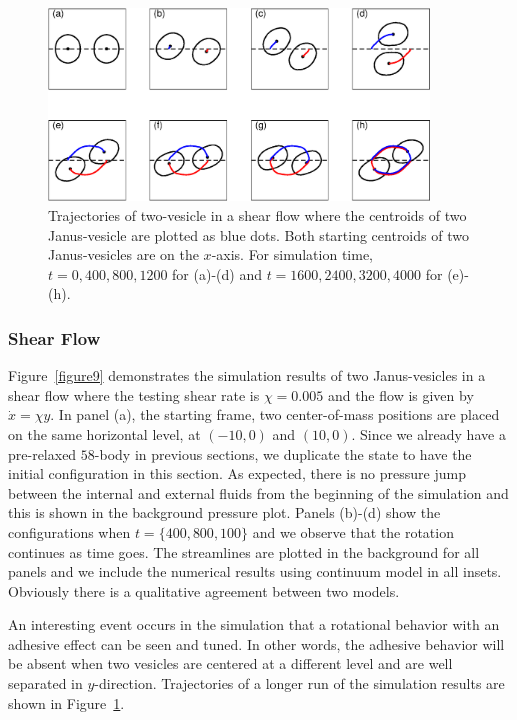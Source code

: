 \documentclass[lineno]{jfm}
\begin{document}
\begin{figure}
\begin{center}
\includegraphics[width=0.9\textwidth]{ShearTraj.eps}
\end{center} 
  \caption{Trajectories of two-vesicle in a shear flow where the centroids of two Janus-vesicle are plotted as blue dots. Both starting centroids of two Janus-vesicles are on the $x$-axis. For simulation time, $t = {0, 400,800,1200}$ for (a)-(d) and $t = {1600, 2400, 3200, 4000}$ for (e)-(h).  }
    \label{figure10}
\end{figure}




\subsubsection{Shear Flow}

Figure~\ref{figure9} demonstrates the simulation results of two Janus-vesicles in a shear flow where the testing shear rate is $\chi=0.005$ and the flow is given by $\dot x = \chi y$. In panel (a), the starting frame, two center-of-mass positions are placed 
on the same horizontal level, at $(-10,0)$ and $(10,0)$. Since we already have a pre-relaxed $58$-body in previous sections, we duplicate the state to have the initial configuration in this section. As expected, there 
is no pressure jump between the internal and external fluids from the beginning of the simulation and this is shown in the background pressure plot. Panels (b)-(d) show the configurations when $t = \{400,800,100\}$ 
and we observe that the rotation continues as time goes. The streamlines are plotted in the background 
for all panels and we include the numerical results using continuum model in all insets. Obviously there is a qualitative agreement between two models.

An interesting event occurs in the simulation that a rotational behavior with an adhesive effect can be seen and tuned. In other words, the adhesive behavior will be absent when two vesicles are centered 
at a different level and are well separated in $y$-direction. Trajectories of a longer run of the simulation results are shown in Figure~\ref{figure10}. 
\end{document}
